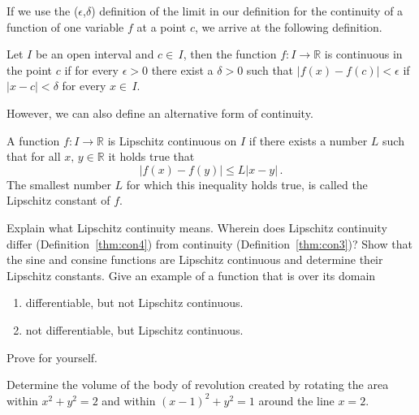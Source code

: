 \begin{Exercise} %
If we use the  ($\epsilon$,$\delta$) definition of the limit in our definition for the continuity of a function of one variable $f$ at a point $c$, we arrive at the following definition. 

\begin{theorem}\label{thm:con3}
Let $I$ be an open interval and $c\in\,I$, then the function $f:I\to\mathbb{R}$ is continuous in the point $c$ if for every $\epsilon>0$ there exist a $\delta>0$ such that $|f(x)-f(c)|<\epsilon$ if $|x-c|<\delta$ for every $x\in\,I$.
\end{theorem}

However, we can also define an alternative form of continuity. 

\begin{theorem}\label{thm:con4}
A function $f:I\to\mathbb{R}$ is Lipschitz continuous on $I$ if there exists a number $L$ such that for all $x,\,y\in\mathbb{R}$ it holds true that 
$$
|f(x)-f(y)|\leq L|x-y|\,. 
$$
The smallest number $\displaystyle L$ for which this inequality holds true, is called the Lipschitz constant of $f$. 
\end{theorem}

\Question Explain what Lipschitz continuity means. 
\Question Wherein does Lipschitz continuity differ (Definition~\ref{thm:con4}) from continuity (Definition~\ref{thm:con3})?
\Question Show that the sine and consine functions are Lipschitz continuous and determine their Lipschitz constants.
\Question Give an example of a function that is over its domain
    \begin{enumerate}
        \item differentiable, but not Lipschitz continuous.
        \item not differentiable, but Lipschitz continuous.
    \end{enumerate}
\EndCurrentQuestion
\end{Exercise}

\begin{Answer}\phantom{}
Prove for yourself.

\end{Answer}

\begin{Exercise} %
Determine the volume of the body of revolution created by rotating the area within $x^2+y^2=2$ and within $(x-1)^2+y^2=1$ around the line $x=2$.
\end{Exercise} 

